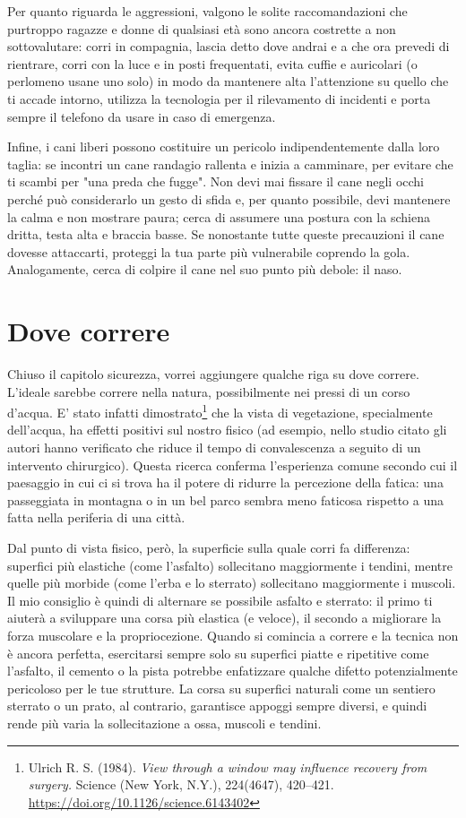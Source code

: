 Per quanto riguarda le aggressioni, valgono le solite raccomandazioni
che purtroppo ragazze e donne di qualsiasi età
sono ancora costrette a non sottovalutare:
corri in compagnia, lascia detto dove andrai e a che ora prevedi di rientrare,
corri con la luce e in posti frequentati, evita cuffie e auricolari
(o perlomeno usane uno solo)
in modo da mantenere alta l'attenzione su quello che ti accade intorno,
utilizza la tecnologia per il rilevamento di incidenti e
porta sempre il telefono da usare in caso di emergenza.

Infine, i cani liberi possono costituire un pericolo indipendentemente
dalla loro taglia: se incontri un cane randagio rallenta e inizia
a camminare, per evitare che ti scambi
per "una preda che fugge".
Non devi mai fissare il cane negli occhi perché può considerarlo
un gesto di sfida
e, per quanto possibile, devi mantenere la calma e non mostrare paura;
cerca di assumere una postura con la schiena dritta, testa alta
e braccia basse.
Se nonostante tutte queste precauzioni il cane dovesse attaccarti,
proteggi la tua parte più vulnerabile coprendo la gola.
Analogamente, cerca di colpire il cane nel suo punto più debole: il naso.

\section{Dove correre}

Chiuso il capitolo sicurezza, vorrei aggiungere
qualche riga su dove correre.
L'ideale sarebbe correre nella natura, possibilmente nei pressi di un corso d'acqua.
E' stato infatti dimostrato\footnote{
    Ulrich R. S. (1984).
    \emph{View through a window may influence recovery from surgery.}
    Science (New York, N.Y.), 224(4647), 420–421.
    \url{https://doi.org/10.1126/science.6143402}
}
che la vista di vegetazione, specialmente dell'acqua,
ha effetti positivi sul nostro fisico
(ad esempio, nello studio citato gli autori hanno verificato che 
riduce il tempo di convalescenza a seguito di un intervento chirurgico).
Questa ricerca conferma l'esperienza comune secondo cui il paesaggio in cui
ci si trova ha il potere di ridurre la percezione della fatica:
una passeggiata in montagna o in un bel parco sembra meno faticosa
rispetto a una fatta nella periferia di una città.

Dal punto di vista fisico, però, la superficie sulla quale corri fa differenza:
superfici più elastiche (come l'asfalto) sollecitano maggiormente i tendini,
mentre quelle più morbide (come l'erba e lo sterrato) sollecitano maggiormente i muscoli.
Il mio consiglio è quindi di alternare se possibile asfalto e sterrato:
il primo ti aiuterà a sviluppare una corsa più elastica (e veloce),
il secondo a migliorare la forza muscolare e la propriocezione.
Quando si comincia a correre e la tecnica non è ancora perfetta,
esercitarsi sempre solo su superfici piatte e ripetitive
come l'asfalto, il cemento o la pista
potrebbe enfatizzare qualche difetto potenzialmente pericoloso per le tue strutture.
La corsa su superfici naturali come un sentiero sterrato o un prato,
al contrario, garantisce appoggi sempre diversi, e quindi rende più varia
la sollecitazione a ossa, muscoli e tendini.

